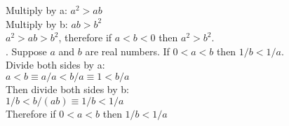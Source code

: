 \documentclass{article}
\begin{document}
Multiply by a: $a^2 > ab$\\
Multiply by b: $ab > b^2$\\
$a^2 > ab > b^2$, therefore if $a < b < 0$ then $a^2 > b^2$.\\
. Suppose $a$ and $b$ are real numbers. If $0 < a < b$ then $1/b < 1/a$. \\
Divide both sides by a:\\
$a < b \equiv a/a < b/a \equiv 1 < b/a $\\
Then divide both sides by b:\\
$1/b < b/(ab) \equiv 1/b < 1/a$\\
Therefore if $0 < a < b$ then $1/b < 1/a$\\
\linebreak
\end{document}
